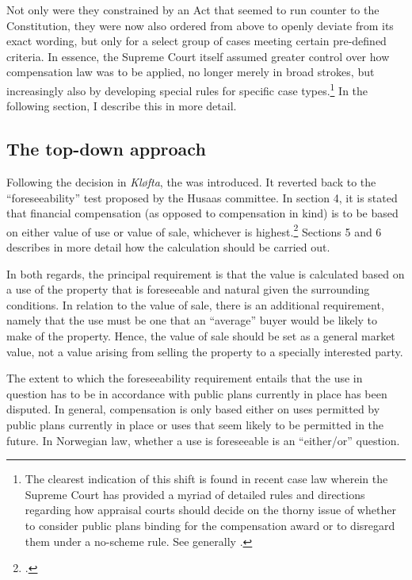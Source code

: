 Not only were they constrained by an Act that seemed to run counter to the Constitution, they were now also ordered from above to openly deviate from its exact wording, but only for a select group of cases meeting certain pre-defined criteria. In essence, the Supreme Court itself assumed greater control over how compensation law was to be applied, no longer merely in broad strokes, but increasingly also by developing special rules for specific case types.\footnote{The clearest indication of this shift is found in recent case law wherein the Supreme Court has provided a myriad of detailed rules and directions regarding how appraisal courts should decide on the thorny issue of whether to consider public plans binding for the compensation award or to disregard them under a no-scheme rule. See generally \cite[7-9]{nou03}.} In the following section, I describe this in more detail.

\subsection{The top-down approach}\label{sec:regab}

Following the decision in {\it Kløfta}, the \cite{84} was introduced. It reverted back to the ``foreseeability'' test proposed by the Husaas committee. In section 4, it is stated that financial compensation (as opposed to compensation in kind) is to be based on either value of use or value of sale, whichever is highest.\footcite[4]{ca84} Sections 5 and 6 describes in more detail how the calculation should be carried out.

In both regards, the principal requirement is that the value is calculated based on a use of the property that is foreseeable and natural given the surrounding conditions. In relation to the value of sale, there is an additional requirement, namely that the use must be one that an ``average'' buyer would be likely to make of the property. Hence, the value of sale should be set as a general market value, not a value arising from selling the property to a specially interested party.

The extent to which the foreseeability requirement entails that the use in question has to be in accordance with public plans currently in place has been disputed. In general, compensation is only based either on uses permitted by public plans currently in place or uses that seem likely to be permitted in the future. In Norwegian law, whether a use is foreseeable is an ``either/or'' question. 

